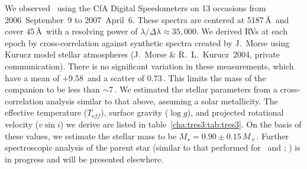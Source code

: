 We observed \tresThree\ using the CfA Digital Speedometers \citep{Latham:ASP:1992a} on 13 occasions from 2006~September~9 to 2007~April~6.
These spectra are centered at 5187\,\AA\ and cover 45\,\AA\ with a resolving power of \mbox{$\lambda/\Delta\lambda \approx 35,\!000$}.
We derived RVs at each epoch by cross-correlation against synthetic spectra created by J.~Morse using Kurucz model stellar atmospheres (J.~Morse \& R.~L.~Kurucz~2004, private communication).
There is no significant variation in these measurements, which have a mean of \mbox{+9.58\,\kms} and a scatter of \mbox{0.73\,\kms}.
This limits the mass of the companion to be less than $\sim$7\,\mjup.
We estimated the stellar parameters from a cross-correlation analysis similar to that above, assuming a solar metallicity.
The effective temperature ($T_{\mathrm eff}$), surface gravity ($\log g$), and projected rotational velocity ($v \sin i$) we derive are listed in table~\ref{cha:tres3:tab:tres3}.
On the basis of these values, we estimate the stellar mass to be $M_{\star}=0.90\pm0.15\,M_{\sun}$.
Further spectroscopic analysis of the parent star (similar to that performed for \tresOne\ and \tresTwo; \citealt{Sozzetti_Yong_Torres:apjl:2004a, Sozzetti_Torres_Charbonneau:apj:2007a}) is in progress and will be presented elsewhere.

